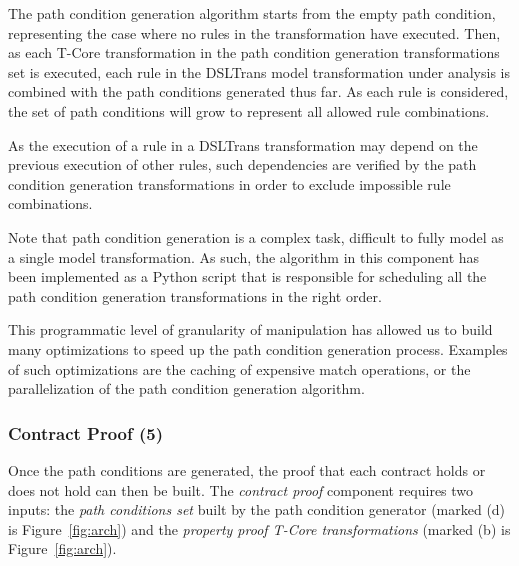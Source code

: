 The path condition generation algorithm starts from the empty path condition,
representing the case where no rules in the transformation have executed. Then,
as each T-Core transformation in the path condition generation
transformations set is executed, each rule in the
DSLTrans model transformation under analysis is combined with the path
conditions generated thus far. As each rule is considered, the set of path
conditions will grow to represent all allowed rule combinations.

As the execution of a rule in a DSLTrans transformation may depend on the
previous execution of other rules, such dependencies are verified by the path
condition generation transformations in order to exclude impossible rule
combinations.


Note that path condition generation is a complex task, difficult to fully model
as a single model transformation.
As such, the algorithm in this component has been implemented as a Python script
that is responsible for scheduling all the path condition generation
transformations in the right order.

This programmatic level of granularity of manipulation has allowed us to build
many optimizations to speed up the path condition generation process. Examples
of such optimizations are the caching of expensive match operations, or the
parallelization of the path condition generation algorithm.
 
\subsubsection{Contract Proof (5)}

Once the path conditions are generated, the proof that each contract holds or
does not hold can then be built. The \emph{contract proof} component requires
two inputs: the \emph{path conditions set} built by the path condition generator
(marked (d) is Figure~\ref{fig:arch}) and the \emph{property proof T-Core
transformations} (marked (b) is Figure~\ref{fig:arch}).


